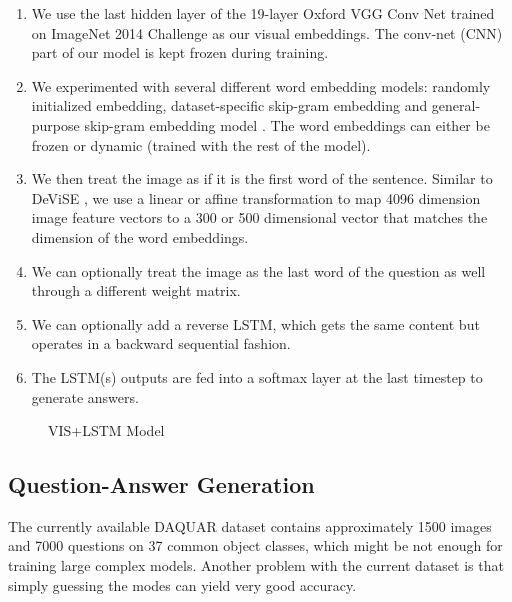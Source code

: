 \documentclass{article}
\renewcommand{\#}[1]{\textbf{#1}}
\begin{document}
\begin{enumerate}
    \item We use the last hidden layer of the 19-layer Oxford VGG Conv Net
      \cite{simonyan14} trained on ImageNet 2014 Challenge \cite{ilsvrc14} 
      as our visual
      embeddings. The conv-net (CNN) part of our model is kept frozen during
      training. 
    \item We experimented with several different word embedding models: randomly 
    initialized embedding, dataset-specific skip-gram embedding and general-purpose 
    skip-gram embedding model \cite{mikolov13}. The word embeddings can either 
    be frozen or dynamic (trained with the rest of the model).
    \item We then treat the image as if it is the first word of the
      sentence. Similar to DeViSE \cite{frome13}, we use a linear or affine
      transformation to map 4096 dimension image feature vectors to a 300 or
      500 dimensional vector that matches the dimension of the word embeddings.
    \item We can optionally treat the image as the last word of the question
      as well through a different weight matrix. 
    \item We can optionally add a reverse LSTM, which gets the same content
      but operates in a backward sequential fashion.
    \item The LSTM(s) outputs are fed into a softmax layer at the last
      timestep to generate answers.
\end{enumerate}

\begin{figure}
\centering
\scalebox{0.7}{
}
\caption{VIS+LSTM Model}
\label{fig:imgword}
\end{figure}

\subsection{Question-Answer Generation}
The currently available DAQUAR dataset contains approximately 1500 images and
7000 questions on 37 common object classes, which might be not enough for
training large complex models. Another problem with the current dataset is
that simply guessing the modes can yield very good accuracy. 
\end{document}
